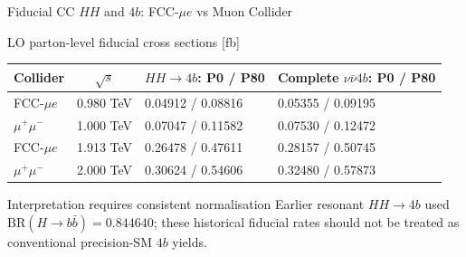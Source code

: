 \documentclass[aspectratio=1610,english]{beamer}
\newcommand{\src}[1]{\vfill{\par\color{black!65}\fontsize{6.4}{7.4}\selectfont\emph{Source:} #1\par}}
\begin{document}
\begin{frame}[t]{Fiducial CC $HH$ and $4b$: FCC-$\mu e$ vs Muon Collider}
\small

\begin{block}{LO parton-level fiducial cross sections [fb]}
\begin{center}\scriptsize\setlength{\tabcolsep}{5pt}\renewcommand{\arraystretch}{1.35}
\begin{tabular}{lcll}\toprule
Collider & $\sqrt{s}$ & $HH\to4b$: P0 / P80 & Complete $\nu\bar\nu4b$: P0 / P80\\\midrule
FCC-$\mu e$ & 0.980 TeV & 0.04912 / 0.08816 & 0.05355 / 0.09195\\
$\mu^+\mu^-$ & 1.000 TeV & 0.07047 / 0.11582 & 0.07530 / 0.12472\\
FCC-$\mu e$ & 1.913 TeV & 0.26478 / 0.47611 & 0.28157 / 0.50745\\
$\mu^+\mu^-$ & 2.000 TeV & 0.30624 / 0.54606 & 0.32480 / 0.57873\\\bottomrule
\end{tabular}\end{center}
\end{block}
\begin{alertblock}{Interpretation requires consistent normalisation}
Earlier resonant $HH\to4b$ used $\mathrm{BR}(H\to b\bar b)=0.844640$; these historical fiducial rates should not be treated as conventional precision-SM $4b$ yields.
\end{alertblock}

\end{frame}
\end{document}
